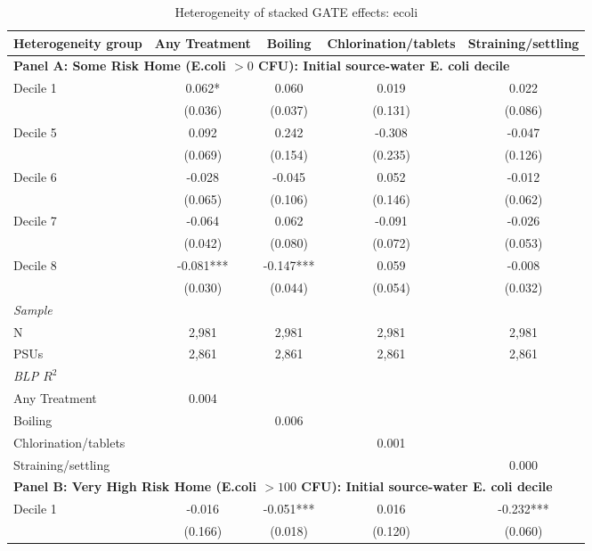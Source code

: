 \begin{landscape}
\begin{table}[p]
\centering
\caption{Heterogeneity of stacked GATE effects: ecoli}
\label{tab:table_gate_main-ecoli}
\scriptsize\setlength{\tabcolsep}{4pt}
\begin{adjustbox}{max width=\linewidth, center}
\begin{tabular}{lcccc}
\toprule
Heterogeneity group & Any Treatment & Boiling & Chlorination/tablets & Straining/settling \\
\midrule
\multicolumn{5}{l}{\textbf{Panel A: Some Risk Home (E.coli $>0$ CFU): Initial source-water E. coli decile}} \\
Decile 1 & 0.062* & 0.060 & 0.019 & 0.022 \\
 & (0.036) & (0.037) & (0.131) & (0.086) \\
Decile 5 & 0.092 & 0.242 & -0.308 & -0.047 \\
 & (0.069) & (0.154) & (0.235) & (0.126) \\
Decile 6 & -0.028 & -0.045 & 0.052 & -0.012 \\
 & (0.065) & (0.106) & (0.146) & (0.062) \\
Decile 7 & -0.064 & 0.062 & -0.091 & -0.026 \\
 & (0.042) & (0.080) & (0.072) & (0.053) \\
Decile 8 & -0.081*** & -0.147*** & 0.059 & -0.008 \\
 & (0.030) & (0.044) & (0.054) & (0.032) \\
\multicolumn{5}{l}{\textit{Sample}} \\
\quad N & 2,981 & 2,981 & 2,981 & 2,981 \\
\quad PSUs & 2,861 & 2,861 & 2,861 & 2,861 \\
\multicolumn{5}{l}{\textit{BLP $R^{2}$}} \\
\quad Any Treatment & 0.004 &  &  &  \\
\quad Boiling &  & 0.006 &  &  \\
\quad Chlorination/tablets &  &  & 0.001 &  \\
\quad Straining/settling &  &  &  & 0.000 \\
\midrule
\multicolumn{5}{l}{\textbf{Panel B: Very High Risk Home (E.coli $>100$ CFU): Initial source-water E. coli decile}} \\
Decile 1 & -0.016 & -0.051*** & 0.016 & -0.232*** \\
 & (0.166) & (0.018) & (0.120) & (0.060) \\

\end{tabular}
\end{adjustbox}
\end{table}
\end{landscape}
